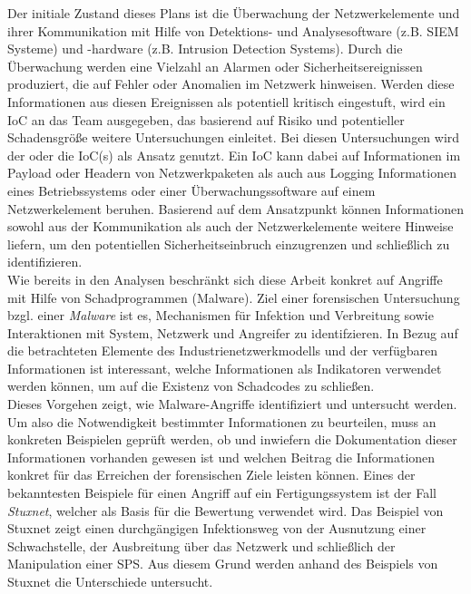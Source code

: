 Der initiale Zustand dieses Plans ist die Überwachung der Netzwerkelemente und ihrer Kommunikation mit Hilfe von Detektions- und Analysesoftware (z.B. SIEM Systeme) und -hardware (z.B. \glqq Intrusion Detection Systems\grqq ). Durch die Überwachung werden eine Vielzahl an Alarmen oder Sicherheitsereignissen produziert, die auf Fehler oder Anomalien im Netzwerk hinweisen. Werden diese Informationen aus diesen Ereignissen als potentiell kritisch eingestuft, wird ein IoC an das Team ausgegeben, das basierend auf Risiko und potentieller Schadensgröße weitere Untersuchungen einleitet. Bei diesen Untersuchungen wird der oder die IoC(s) als Ansatz genutzt. Ein IoC kann dabei auf Informationen im Payload oder Headern von Netzwerkpaketen als auch aus Logging Informationen eines Betriebssystems oder einer Überwachungssoftware auf einem Netzwerkelement beruhen. Basierend auf dem Ansatzpunkt können Informationen sowohl aus der Kommunikation als auch der Netzwerkelemente weitere Hinweise liefern, um den potentiellen Sicherheitseinbruch einzugrenzen und schließlich zu identifizieren. \\

Wie bereits in den Analysen beschränkt sich diese Arbeit konkret auf Angriffe mit Hilfe von Schadprogrammen (Malware). Ziel einer forensischen Untersuchung bzgl. einer \textit{Malware} ist es, Mechanismen für Infektion und Verbreitung sowie Interaktionen mit System, Netzwerk und Angreifer zu identifzieren. In Bezug auf die betrachteten Elemente des Industrienetzwerkmodells und der verfügbaren Informationen ist interessant, welche Informationen als Indikatoren verwendet werden können, um auf die Existenz von Schadcodes zu schließen.\\

Dieses Vorgehen zeigt, wie Malware-Angriffe identifiziert und untersucht werden. Um also die Notwendigkeit bestimmter Informationen zu beurteilen, muss an konkreten Beispielen geprüft werden, ob und inwiefern die Dokumentation dieser Informationen vorhanden gewesen ist und welchen Beitrag die Informationen konkret für das Erreichen der forensischen Ziele leisten können. Eines der bekanntesten Beispiele für einen Angriff auf ein Fertigungssystem ist der Fall \textit{Stuxnet}, welcher als Basis für die Bewertung verwendet wird. Das Beispiel von Stuxnet zeigt einen durchgängigen Infektionsweg von der Ausnutzung einer Schwachstelle, der Ausbreitung über das Netzwerk und schließlich der Manipulation einer SPS. Aus diesem Grund werden anhand des Beispiels von Stuxnet die Unterschiede untersucht.

